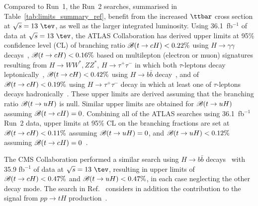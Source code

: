 Compared to Run~1, the Run~2 searches, summarised in Table~\ref{tab:limits_summary_ref}, benefit from the increased $\ttbar$ cross section at $\sqrt{s}=13~\tev$, as well as the larger integrated luminosity.
Using 36.1~fb$^{-1}$ of data at $\sqrt{s}=13~\tev$, the ATLAS Collaboration has derived upper limits at 95\% confidence level (CL) of branching ratio
$\mathscr{B}(t\to cH)<0.22\%$ using $H\to \gamma\gamma$ decays~\cite{Aaboud:2017mfd}, $\mathscr{B}(t\to cH)<0.16\%$ based on
multilepton (electron or muon) signatures resulting from 
$H \to  WW^*, ZZ^*$, $H\to \tau^+\tau^-$ in which both $\tau$-leptons decay leptonically~\cite{Aaboud:2018pob},
$\mathscr{B}(t\to cH)<0.42\%$ using $H\to b\bar{b}$ decay~\cite{fcnc36}, and of $\mathscr{B}(t\to cH)<0.19\%$ using $H\to \tau^+\tau^-$ decay in which at least
one of $\tau$-leptons decays hadronically~\cite{fcnc36}.  
These upper limits are derived assuming that the branching ratio $\mathscr{B}(t\to uH)$ is null. Similar upper limits are obtained for $\mathscr{B}(t\to uH)$ assuming $\mathscr{B}(t\to cH)=0$.
Combining all of the ATLAS searches using 36.1~fb$^{-1}$ Run~2 data, upper limits at 95\% CL on the branching fractions are 
set at $\mathscr{B}(t\to cH)<0.11\%$ assuming $\mathscr{B}(t\to uH)=0$, and $\mathscr{B}(t\to uH)<0.12\%$ assuming $\mathscr{B}(t\to cH)=0$~\cite{fcnc36}.

The CMS Collaboration performed a similar search using  
$H\to b\bar{b}$ decays~\cite{Sirunyan:2017uae} with 35.9 fb$^{-1}$ of data at $\sqrt{s}=13~\tev$, resulting 
in upper limits of $\mathscr{B}(t\to cH)<0.47\%$ and $\mathscr{B}(t\to uH)<0.47\%$, in each case neglecting the other decay mode.
The search in Ref.~\cite{Sirunyan:2017uae} considers in addition the contribution to the signal from 
$pp \to tH$ production~\cite{Greljo:2014dka}. 


